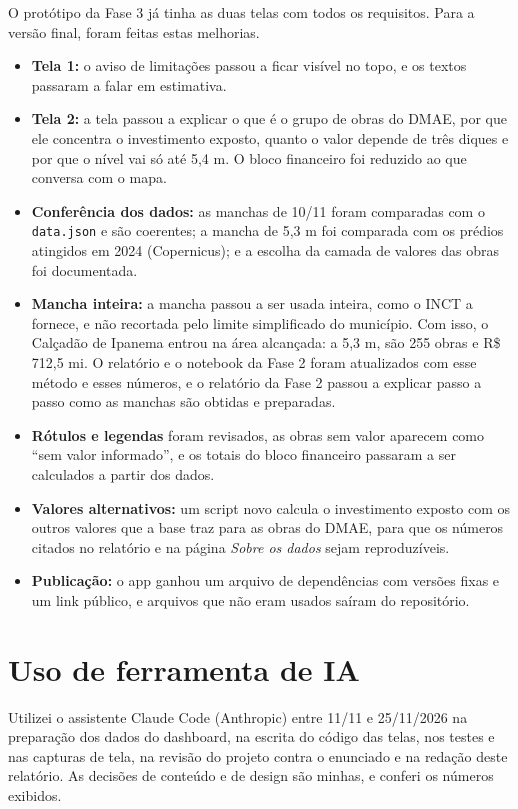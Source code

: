 \documentclass[11pt,a4paper]{article}
\newcommand{\campo}[1]{\texttt{#1}}
\begin{document}
O protótipo da Fase 3 já tinha as duas telas com todos os requisitos. Para a versão final, foram feitas estas melhorias.

\begin{itemize}
\item \textbf{Tela 1:} o aviso de limitações passou a ficar visível no topo, e os textos passaram a falar em estimativa.
\item \textbf{Tela 2:} a tela passou a explicar o que é o grupo de obras do DMAE, por que ele concentra o investimento exposto, quanto o valor depende de três diques e por que o nível vai só até 5,4 m. O bloco financeiro foi reduzido ao que conversa com o mapa.
\item \textbf{Conferência dos dados:} as manchas de 10/11 foram comparadas com o \campo{data.json} e são coerentes; a mancha de 5,3 m foi comparada com os prédios atingidos em 2024 (Copernicus); e a escolha da camada de valores das obras foi documentada.
\item \textbf{Mancha inteira:} a mancha passou a ser usada inteira, como o INCT a fornece, e não recortada pelo limite simplificado do município. Com isso, o Calçadão de Ipanema entrou na área alcançada: a 5,3 m, são 255 obras e R\$ 712,5 mi. O relatório e o notebook da Fase 2 foram atualizados com esse método e esses números, e o relatório da Fase 2 passou a explicar passo a passo como as manchas são obtidas e preparadas.
\item \textbf{Rótulos e legendas} foram revisados, as obras sem valor aparecem como ``sem valor informado'', e os totais do bloco financeiro passaram a ser calculados a partir dos dados.
\item \textbf{Valores alternativos:} um script novo calcula o investimento exposto com os outros valores que a base traz para as obras do DMAE, para que os números citados no relatório e na página \emph{Sobre os dados} sejam reproduzíveis.
\item \textbf{Publicação:} o app ganhou um arquivo de dependências com versões fixas e um link público, e arquivos que não eram usados saíram do repositório.
\end{itemize}

\section{Uso de ferramenta de IA}

Utilizei o assistente Claude Code (Anthropic) entre 11/11 e 25/11/2026 na preparação dos dados do dashboard, na escrita do código das telas, nos testes e nas capturas de tela, na revisão do projeto contra o enunciado e na redação deste relatório. As decisões de conteúdo e de design são minhas, e conferi os números exibidos.
\end{document}
